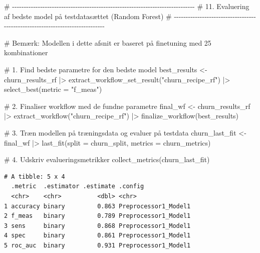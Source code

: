 \documentclass[
  11pt,
  letterpaper,
  DIV=11,
  numbers=noendperiod]{scrartcl}
\newenvironment{Shaded}{\begin{snugshade}}{\end{snugshade}}
\newcommand{\AttributeTok}[1]{\textcolor[rgb]{0.40,0.45,0.13}{#1}}
\newcommand{\CommentTok}[1]{\textcolor[rgb]{0.37,0.37,0.37}{#1}}
\newcommand{\FunctionTok}[1]{\textcolor[rgb]{0.28,0.35,0.67}{#1}}
\newcommand{\NormalTok}[1]{\textcolor[rgb]{0.00,0.23,0.31}{#1}}
\newcommand{\OtherTok}[1]{\textcolor[rgb]{0.00,0.23,0.31}{#1}}
\newcommand{\SpecialCharTok}[1]{\textcolor[rgb]{0.37,0.37,0.37}{#1}}
\newcommand{\StringTok}[1]{\textcolor[rgb]{0.13,0.47,0.30}{#1}}
\begin{document}
\begin{Shaded}
\begin{Highlighting}[]
\CommentTok{\# {-}{-}{-}{-}{-}{-}{-}{-}{-}{-}{-}{-}{-}{-}{-}{-}{-}{-}{-}{-}{-}{-}{-}{-}{-}{-}{-}{-}{-}{-}{-}{-}{-}{-}{-}{-}{-}{-}{-}{-}{-}{-}{-}{-}{-}{-}{-}{-}{-}{-}{-}{-}{-}{-}{-}{-}{-}{-}{-}{-}{-}{-}{-}{-}{-}{-}{-}{-}{-}{-}{-}{-}{-}{-}{-}{-}{-}{-}}
\CommentTok{\# 11. Evaluering af bedste model på testdatasættet (Random Forest) }
\CommentTok{\# {-}{-}{-}{-}{-}{-}{-}{-}{-}{-}{-}{-}{-}{-}{-}{-}{-}{-}{-}{-}{-}{-}{-}{-}{-}{-}{-}{-}{-}{-}{-}{-}{-}{-}{-}{-}{-}{-}{-}{-}{-}{-}{-}{-}{-}{-}{-}{-}{-}{-}{-}{-}{-}{-}{-}{-}{-}{-}{-}{-}{-}{-}{-}{-}{-}{-}{-}{-}{-}{-}{-}{-}{-}{-}{-}{-}{-}{-}}

\CommentTok{\# Bemærk: Modellen i dette afsnit er baseret på finetuning med 25 kombinationer}

\CommentTok{\# 1. Find bedste parametre for den bedste model}
\NormalTok{best\_results }\OtherTok{\textless{}{-}}\NormalTok{ churn\_results\_rf }\SpecialCharTok{|\textgreater{}}
  \FunctionTok{extract\_workflow\_set\_result}\NormalTok{(}\StringTok{"churn\_recipe\_rf"}\NormalTok{) }\SpecialCharTok{|\textgreater{}}
  \FunctionTok{select\_best}\NormalTok{(}\AttributeTok{metric =} \StringTok{"f\_meas"}\NormalTok{)}

\CommentTok{\# 2. Finaliser workflow med de fundne parametre}
\NormalTok{final\_wf }\OtherTok{\textless{}{-}}\NormalTok{ churn\_results\_rf }\SpecialCharTok{|\textgreater{}}
  \FunctionTok{extract\_workflow}\NormalTok{(}\StringTok{"churn\_recipe\_rf"}\NormalTok{) }\SpecialCharTok{|\textgreater{}}
  \FunctionTok{finalize\_workflow}\NormalTok{(best\_results)}

\CommentTok{\# 3. Træn modellen på træningsdata og evaluer på testdata}
\NormalTok{churn\_last\_fit }\OtherTok{\textless{}{-}}\NormalTok{ final\_wf }\SpecialCharTok{|\textgreater{}} 
  \FunctionTok{last\_fit}\NormalTok{(}\AttributeTok{split =}\NormalTok{ churn\_split, }\AttributeTok{metrics =}\NormalTok{ churn\_metrics)}

\CommentTok{\# 4. Udskriv evalueringsmetrikker}
\FunctionTok{collect\_metrics}\NormalTok{(churn\_last\_fit)}
\end{Highlighting}
\end{Shaded}

\begin{verbatim}
# A tibble: 5 x 4
  .metric  .estimator .estimate .config             
  <chr>    <chr>          <dbl> <chr>               
1 accuracy binary         0.863 Preprocessor1_Model1
2 f_meas   binary         0.789 Preprocessor1_Model1
3 sens     binary         0.868 Preprocessor1_Model1
4 spec     binary         0.861 Preprocessor1_Model1
5 roc_auc  binary         0.931 Preprocessor1_Model1
\end{verbatim}
\end{document}
